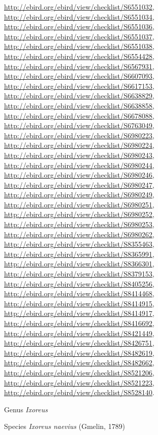 \documentclass[9pt, article]{memoir}
\begin{document}
\begin{multicols}{2}
\url{http://ebird.org/ebird/view/checklist/S6551032}, 
\url{http://ebird.org/ebird/view/checklist/S6551034}, 
\url{http://ebird.org/ebird/view/checklist/S6551036}, 
\url{http://ebird.org/ebird/view/checklist/S6551037}, 
\url{http://ebird.org/ebird/view/checklist/S6551038}, 
\url{http://ebird.org/ebird/view/checklist/S6554428}, 
\url{http://ebird.org/ebird/view/checklist/S6567931}, 
\url{http://ebird.org/ebird/view/checklist/S6607093}, 
\url{http://ebird.org/ebird/view/checklist/S6617153}, 
\url{http://ebird.org/ebird/view/checklist/S6638829}, 
\url{http://ebird.org/ebird/view/checklist/S6638858}, 
\url{http://ebird.org/ebird/view/checklist/S6678088}, 
\url{http://ebird.org/ebird/view/checklist/S6763049}, 
\url{http://ebird.org/ebird/view/checklist/S6980223}, 
\url{http://ebird.org/ebird/view/checklist/S6980224}, 
\url{http://ebird.org/ebird/view/checklist/S6980243}, 
\url{http://ebird.org/ebird/view/checklist/S6980244}, 
\url{http://ebird.org/ebird/view/checklist/S6980246}, 
\url{http://ebird.org/ebird/view/checklist/S6980247}, 
\url{http://ebird.org/ebird/view/checklist/S6980249}, 
\url{http://ebird.org/ebird/view/checklist/S6980251}, 
\url{http://ebird.org/ebird/view/checklist/S6980252}, 
\url{http://ebird.org/ebird/view/checklist/S6980253}, 
\url{http://ebird.org/ebird/view/checklist/S6980262}, 
\url{http://ebird.org/ebird/view/checklist/S8355463}, 
\url{http://ebird.org/ebird/view/checklist/S8365991}, 
\url{http://ebird.org/ebird/view/checklist/S8366301}, 
\url{http://ebird.org/ebird/view/checklist/S8379153}, 
\url{http://ebird.org/ebird/view/checklist/S8405256}, 
\url{http://ebird.org/ebird/view/checklist/S8414468}, 
\url{http://ebird.org/ebird/view/checklist/S8414915}, 
\url{http://ebird.org/ebird/view/checklist/S8414917}, 
\url{http://ebird.org/ebird/view/checklist/S8416692}, 
\url{http://ebird.org/ebird/view/checklist/S8421449}, 
\url{http://ebird.org/ebird/view/checklist/S8426751}, 
\url{http://ebird.org/ebird/view/checklist/S8482619}, 
\url{http://ebird.org/ebird/view/checklist/S8482662}, 
\url{http://ebird.org/ebird/view/checklist/S8521206}, 
\url{http://ebird.org/ebird/view/checklist/S8521223}, 
\url{http://ebird.org/ebird/view/checklist/S8528140}.

\vspace{6pt}\noindent\hspace{30pt}Genus \textit{Ixoreus}


\vspace{6pt}\noindent\hspace{36pt}Species \textit{Ixoreus naevius} (Gmelin, 1789)



\end{multicols}
\end{document}
